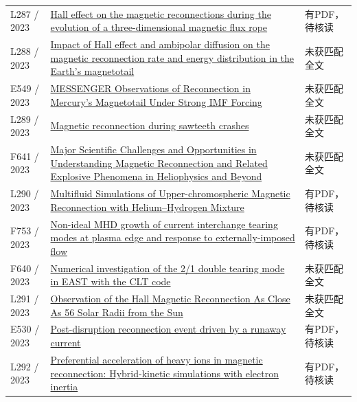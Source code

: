 \documentclass[UTF8,a4paper,11pt,openany,fontset=fandol]{ctexbook}
\begin{document}
\begin{longtable}{P{24mm}P{97mm}P{27mm}}
L287 / 2023 & \href{https://doi.org/10.1088/1402-4896/acd3bb}{Hall effect on the magnetic reconnections during the evolution of a three-dimensional magnetic flux rope} & 有PDF，待核读\\

L288 / 2023 & \href{https://noesis.uis.edu.co/handle/20.500.14071/12490}{Impact of Hall effect and ambipolar diffusion on the magnetic reconnection rate and energy distribution in the Earth’s magnetotail} & 未获匹配全文\\

E549 / 2023 & \href{https://doi.org/10.1029/2022ja031134}{MESSENGER Observations of Reconnection in Mercury's Magnetotail Under Strong IMF Forcing} & 未获匹配全文\\

L289 / 2023 & \href{https://doi.org/10.1063/5.0169243}{Magnetic reconnection during sawteeth crashes} & 未获匹配全文\\

F641 / 2023 & \href{https://doi.org/10.3847/25c2cfeb.e22a8d1f}{Major Scientific Challenges and Opportunities in Understanding Magnetic Reconnection and Related Explosive Phenomena in Heliophysics and Beyond} & 未获匹配全文\\

L290 / 2023 & \href{https://doi.org/10.3847/1538-4357/acbfb1}{Multifluid Simulations of Upper-chromospheric Magnetic Reconnection with Helium–Hydrogen Mixture} & 有PDF，待核读\\

F753 / 2023 & \href{https://doi.org/10.1063/5.0106785}{Non-ideal MHD growth of current interchange tearing modes at plasma edge and response to externally-imposed flow} & 有PDF，待核读\\

F640 / 2023 & \href{https://doi.org/10.1063/5.0159182}{Numerical investigation of the 2/1 double tearing mode in EAST with the CLT code} & 未获匹配全文\\

L291 / 2023 & \href{https://doi.org/10.3847/1538-4357/acbdf6}{Observation of the Hall Magnetic Reconnection As Close As 56 Solar Radii from the Sun} & 未获匹配全文\\

E530 / 2023 & \href{https://doi.org/10.1063/5.0174167}{Post-disruption reconnection event driven by a runaway current} & 有PDF，待核读\\

L292 / 2023 & \href{https://doi.org/10.48550/arxiv.2307.13268}{Preferential acceleration of heavy ions in magnetic reconnection: Hybrid-kinetic simulations with electron inertia} & 有PDF，待核读\\


\end{longtable}
\end{document}
